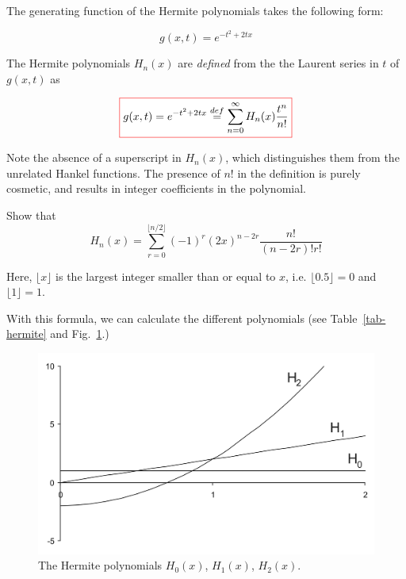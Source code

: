The generating function of the Hermite polynomials takes the following form:

\begin{equation}
g(x,t) = e^{-t^2 + 2tx} \label{eq-gen-hermite}
\end{equation}

The Hermite polynomials $H_n(x)$ are \emph{defined} from the the Laurent series in $t$ of $g(x,t)$ as 

\begin{equation}
\fbox{$\displaystyle
  g(x,t) = e^{-t^2 + 2tx} \stackrel{def}{=} \sum_{n = 0}^{\infty} H_n(x)\frac{t^n}{n!} \label{eq-g-hermite}
$}
\end{equation} 

\noindent{}Note the absence of a superscript in $H_n(x)$, which distinguishes them from the unrelated Hankel functions. The presence of $n!$ in the definition is purely cosmetic, and results in integer coefficients in the polynomial.

\begin{exer}
\noindent{}Show that
$$H_n(x) = \sum_{r=0}^{\lfloor n/2 \rfloor}(-1)^r {(2x)}^{n-2r} \frac{n!}{(n-2r)! r!}$$
\end{exer}

Here, $\lfloor x \rfloor$ is the largest integer smaller than or equal to $x$, i.e. $\lfloor 0.5 \rfloor=0$ and $\lfloor 1 \rfloor=1$.

With this formula, we can calculate the different polynomials (see Table~\ref{tab-hermite} and Fig.~\ref{fig-hermite}.)

\begin{figure}
\centering
\includegraphics[scale=0.7]{hermite/figures/hermite}
\caption{The Hermite polynomials $H_0(x)$, $H_1(x)$, $H_2(x)$.}
\label{fig-hermite}
\end{figure}


